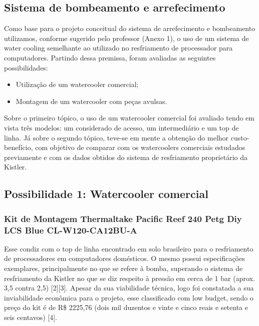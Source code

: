 \subsection{Sistema de bombeamento e arrefecimento}

Como base para o projeto conceitual do sistema de arrefecimento e bombeamento utilizamos, conforme sugerido pelo professor (Anexo 1), o uso de um sistema de water cooling semelhante ao utilizado no resfriamento de processador para computadores. Partindo dessa premissa, foram avaliadas as seguintes possibilidades:

\begin{itemize}
\item Utilização de um watercooler comercial;
\item Montagem de um watercooler com peças avulsas.
\end{itemize}

Sobre o primeiro tópico, o uso de um watercooler comercial foi avaliado tendo em vista três modelos: um considerado de acesso, um intermediário e um top de linha. Já sobre o segundo tópico, teve-se em mente a obtenção do melhor custo-benefício, com objetivo de comparar com os watercoolers comerciais estudados previamente e com os dados obtidos do sistema de resfriamento proprietário da Kistler.

\subsection{Possibilidade 1: Watercooler comercial}

\subsubsection{Kit de Montagem Thermaltake Pacific Reef 240 Petg Diy LCS Blue CL-W120-CA12BU-A}

Esse condiz com o top de linha encontrado em solo brasileiro para o resfriamento de processadores em computadores domésticos. O mesmo possui especificações exemplares, principalmente no que se refere à bomba, superando o sistema de resfriamento da Kistler no que se diz respeito à pressão em cerca de 1 bar (aprox. 3,5 contra 2,5) [2][3].
Apesar da sua viabilidade técnica, logo foi constatada a sua inviabilidade econômica para o projeto, esse classificado com low budget, sendo o preço do kit é de R\$ 2225,76 (dois mil duzentos e vinte e cinco reais e setenta e seis centavos) [4].

